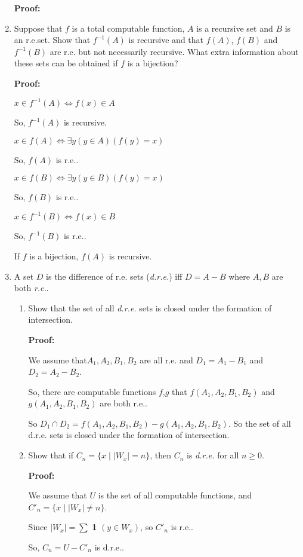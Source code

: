 \documentclass[12pt,a4paper]{article}
\theoremstyle{definition}
\numberwithin{equation}{section}
\numberwithin{figure}{section}
\begin{document}
\begin{enumerate}
\textbf{Proof:}



\item Suppose that $f$ is a total computable function, $A$ is a recursive set and $B$ is an r.e.set. Show that $f^{-1}(A)$ is recursive and that $f(A)$, $f(B)$ and $f^{-1}(B)$ are r.e. but not necessarily recursive. What extra information about these sets can be obtained if $f$ is a bijection?

\textbf{Proof:}

$x \in f^{-1}(A) \Leftrightarrow f(x) \in A$

So, $f^{-1}(A)$ is recursive.

$x \in f(A) \Leftrightarrow \exists y(y \in A)(f(y) = x)$

So, $f(A)$ is r.e..

$x \in f(B) \Leftrightarrow \exists y(y \in B)(f(y) = x)$

So, $f(B)$ is r.e..

$x \in f^{-1}(B) \Leftrightarrow f(x) \in B$

So, $f^{-1}(B)$ is r.e..

If $f$ is a bijection, $f(A)$ is recursive.

\item A set $D$ is the difference of r.e. sets (\emph{d.r.e.}) iff $D=A-B$ where $A,B$ are both \emph{r.e.}.
\begin{enumerate}
\item Show that the set of all \emph{d.r.e.} sets is closed under the formation of intersection.

\textbf{Proof:}

We assume that$A_1, A_2, B_1, B_2$ are all r.e. and $D_1 = A_1 - B_1$ and $D_2 = A_2 - B_2$.

So, there are computable functions $f$,$g$ that $f(A_1,A_2,B_1,B_2)$ and $g(A_1,A_2,B_1,B_2)$ are both r.e..

So $D_1 \cap D_2 = f(A_1,A_2,B_1,B_2) - g(A_1,A_2,B_1,B_2)$. So the set of all d.r.e. sets is closed under the formation of intersection.

\item Show that if $C_n = \{x \mid |W_x|=n \}$, then $C_n$ is \emph{d.r.e.} for all $n \ge 0$.

\textbf{Proof:}

We assume that $U$ is the set of all computable functions, and $C'_n =  \{x \mid |W_x| \neq n \}$.

Since $|W_x| = \sum$ \textbf{1} $(y \in W_x)$, so $C'_n$ is r.e..

So, $C_n = U - C'_n$ is d.r.e..



\end{enumerate}



\end{enumerate}
\end{document}
